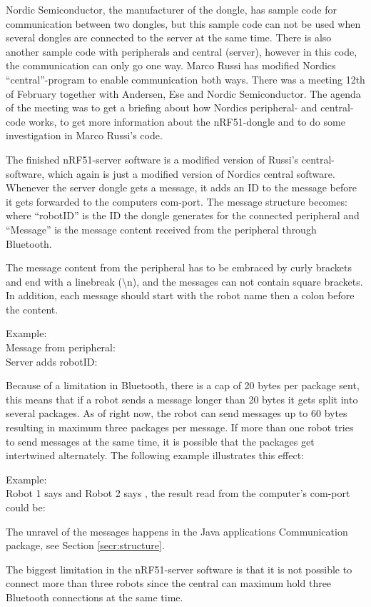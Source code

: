 Nordic Semiconductor, the manufacturer of the dongle, has sample code for communication between two dongles, but this sample code can not be used when several dongles are connected to the server at the same time. There is also another sample code with peripherals and central (server), however in this code, the communication can only go one way. Marco Russi  \cite{marcoRussi} has modified Nordics ``central''-program to enable communication both ways. There was a meeting 12th of February together with Andersen, Ese and Nordic Semiconductor. The agenda of the meeting was to get a briefing about how Nordics peripheral- and central-code works, to get more information about the nRF51-dongle and to do some investigation in Marco Russi's code.

The finished nRF51-server software is a modified version of Russi's central-software, which again is just a modified version of Nordics central software. Whenever the server dongle gets a message, it adds an ID to the message before it gets forwarded to the computers \acrshort{com}-port. The message structure becomes: where ``robotID'' is the ID the dongle generates for the connected peripheral and ``Message'' is the message content received from the peripheral through Bluetooth. 

The message content from the peripheral has to be embraced by curly brackets and end with a linebreak (\textbackslash n), and the messages can not contain square brackets. In addition, each message should start with the robot name then a colon before the content. 

Example:\\
Message from peripheral:  \\
Server adds robotID: 

Because of a limitation in Bluetooth, there is a cap of 20 bytes per package sent, this means that if a robot sends a message longer than 20 bytes it gets split into several packages. As of right now, the robot can send messages up to 60 bytes resulting in maximum three packages per message. If more than one robot tries to send messages at the same time, it is possible that the packages get intertwined alternately. The following example illustrates this effect:

Example:\\
Robot 1 says  and Robot 2 says , the result read from the computer's \acrshort{com}-port could be: \\

The unravel of the messages happens in the Java applications Communication package, see Section \ref{secr:structure}.

The biggest limitation in the nRF51-server software is that it is not possible to connect more than three robots since the central can maximum hold three Bluetooth connections at the same time.